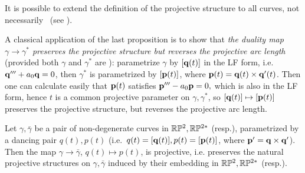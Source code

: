 \begin{rmrk} It is possible to extend the definition of the projective structure  to all curves, not necessarily \lc\ (see  \cite{DZ}). 
\end{rmrk}

\begin{example} A classical application of the last proposition is to show that 
{\em  the duality map $\gamma\to \gamma^*$ preserves the projective structure but reverses the projective arc length} 
(provided both $\gamma$ and $\gamma^*$ are \lc): 
parametrize $\gamma$ by $[\mathbf q(t)]$ in the LF form, i.e. $\mathbf q'''+a_0\mathbf q=0$, 
then $\gamma^*$ is parametrized by $[{\mathbf p}(t)]$, where ${\mathbf p}(t)=\mathbf q(t)\times \mathbf q'(t)$. 
Then one can calculate easily that ${\mathbf p}(t)$ satisfies ${\mathbf p}'''-a_0{\mathbf p}=0,$ which is also in the LF form, hence 
$t$ is a common projective parameter on $\gamma,\gamma^*$, so 
$[\mathbf q(t)]\mapsto [{\mathbf p}(t)]$ preserves the projective structure, but reverses the projective arc length.
\end{example}

\begin{proposition}\label{TwentyOne}
Let $\gamma, \bar \gamma$ be a pair of non-degenerate curves in $\mathbb{R}\mathbb{P}^2,\mathbb{R}\mathbb{P}^{2*}$ (resp.), parametrized by a dancing pair $q(t), p(t)$ (i.e.~$q(t)=[\mathbf q(t)], p(t)=[{\mathbf p}(t)]$, where ${\mathbf p}'=\mathbf q\times \mathbf q'$). Then the map $\gamma\to\bar \gamma$, $q(t)\mapsto p(t)$, is projective, i.e. preserves the natural projective structures on $\gamma, \bar \gamma$ induced by their embedding in $\mathbb{R}\mathbb{P}^2, \mathbb{R}\mathbb{P}^{2*}$ (resp.). 
\end{proposition}


